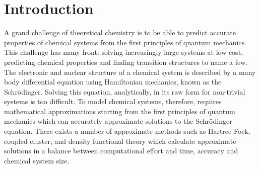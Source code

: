 
\section{Introduction}
A grand challenge of theoretical chemistry is to be able to predict accurate properties of chemical systems from the first principles of quantum mechanics. This challenge has many front:  solving increasingly large systems at low cost, predicting chemical properties and finding transition structures to name a few. The electronic and nuclear structure of a chemical system is described by a many body differential equation using Hamiltonian mechanics, known as the Schr{\"o}dinger.  Solving this equation, analytically, in its raw form for non-trivial systems is too difficult. To model chemical systems, therefore, requires mathematical approximations starting from the first principles of quantum mechanics which can accurately approximate solutions to the Schr{\"o}dinger equation.  There exists a number of approximate methods such as Hartree Fock, coupled cluster, and density functional theory which calculate approximate solutions in a balance between computational effort and time, accuracy and chemical system size.

